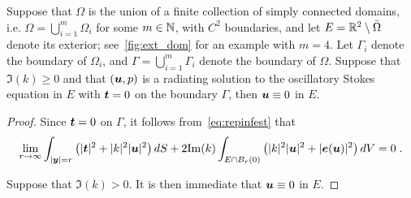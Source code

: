\begin{theorem}
  Suppose that $\Omega$ is the union of a finite collection 
  of simply connected domains, i.e. $\Omega = \bigcup_{i=1}^m \Omega_{i}$
  for some $m \in \mathbb{N}$, with $C^{2}$ boundaries, 
  and let $E = \mathbb{R}^{2} \setminus \bar{\Omega}$ denote its exterior;
  see~\cref{fig:ext_dom} for an example with $m=4$.
  Let $\Gamma_{i}$ denote the boundary of $\Omega_{i}$, 
  and $\Gamma = \bigcup_{i=1}^{m} \Gamma_{i}$ denote the boundary
  of $\Omega$.
  Suppose that $\Im(k)\geq 0$ and 
  that $({\boldsymbol u},p)$ is a radiating solution to the oscillatory Stokes
  equation in $E$ with ${\boldsymbol t} = 0$ on the boundary $\Gamma$, then
  ${\boldsymbol u} \equiv 0$ in $E$.
\end{theorem}

\begin{proof}
Since ${\boldsymbol t} = 0$ on $\Gamma$, it follows
from~\cref{eq:repinfest} that
\begin{equation}
\lim_{r\to\infty}
\int_{|{\boldsymbol y}|=r} \left( |{\boldsymbol t}|^2 + |k|^2 |{\boldsymbol u}|^2 \right) dS +
2 {\textrm{\textup{Im}}}(k) \int_{E \cap B_{r}(0)} \left(|k|^2 |{\boldsymbol u}|^2 + |{\boldsymbol e}({\boldsymbol u})|^2 \right)
dV = 0 \; . \nonumber
\end{equation}

Suppose that $\Im(k) > 0$. It is then immediate
that ${\boldsymbol u} \equiv 0$ in $E$.


\end{proof}
